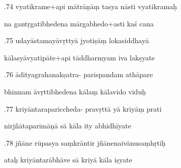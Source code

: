 \documentclass[article,12pt,a4paper]{memoir}%
\newcounter{parCount}
\begin{document}
	  
	  \pstart {}.74 vyatikrame+api mātrāṇāṃ tasya nāsti vyatikramaḥ 
	{}
	\pend%
      

	  
	  \pstart \leavevmode%
	na gantṛgatibhedena mārgabhedo+asti kaś cana 
	{}
	\pend%
      

	  
	  \pstart {}.75 udayāstamayāvṛttyā jyotiṣāṃ lokasiddhayā 
	{}
	\pend%
      

	  
	  \pstart \leavevmode%
	kālasyāvyatipāte+api tāddharmyam iva lakṣyate 
	{}
	\pend%
      

	  
	  \pstart {}.76 ādityagrahanakṣatra- parispandam athāpare 
	{}
	\pend%
      

	  
	  \pstart \leavevmode%
	bhinnam āvṛttibhedena kālaṃ kālavido viduḥ 
	{}
	\pend%
      

	  
	  \pstart {}.77 kriyāntarapariccheda- pravṛttā yā kriyāṃ prati 
	{}
	\pend%
      

	  
	  \pstart \leavevmode%
	nirjñātaparimāṇā sā kāla ity abhidhīyate 
	{}
	\pend%
      

	  
	  \pstart {}.78 jñāne rūpasya saṃkrāntir   jñānenaivānusaṃhṛtiḥ 
	{}
	\pend%
      

	  
	  \pstart \leavevmode%
	ataḥ kriyāntarābhāve sā kriyā kāla iṣyate 
	{}
	\pend%
      
\end{document}

